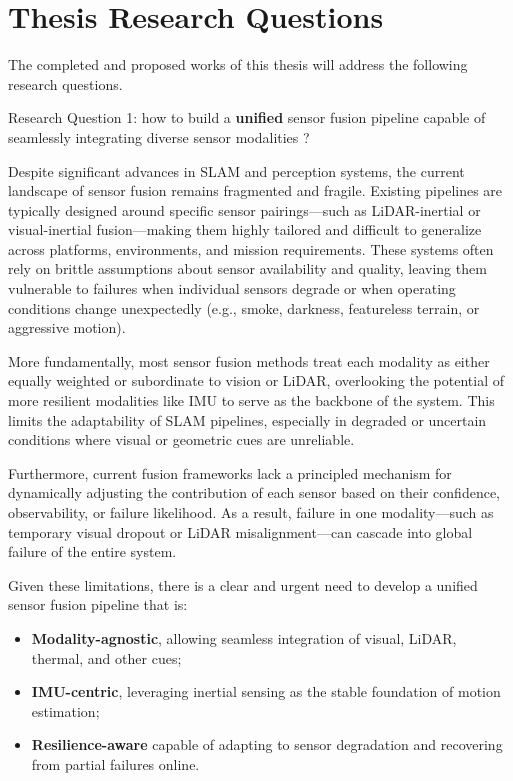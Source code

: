 \section{Thesis Research Questions}
\label{sec:thesis_research_questions}

The completed and proposed works of this thesis will address the following research questions. 

\begin{framed}
Research Question 1: how to build a \textbf{unified} sensor fusion pipeline capable of seamlessly integrating diverse sensor modalities ?
\end{framed}

Despite significant advances in SLAM and perception systems, the current landscape of sensor fusion remains fragmented and fragile. Existing pipelines are typically designed around specific sensor pairings—such as LiDAR-inertial or visual-inertial fusion—making them highly tailored and difficult to generalize across platforms, environments, and mission requirements. These systems often rely on brittle assumptions about sensor availability and quality, leaving them vulnerable to failures when individual sensors degrade or when operating conditions change unexpectedly (e.g., smoke, darkness, featureless terrain, or aggressive motion).

More fundamentally, most sensor fusion methods treat each modality as either equally weighted or subordinate to vision or LiDAR, overlooking the potential of more resilient modalities like IMU to serve as the backbone of the system. This limits the adaptability of SLAM pipelines, especially in degraded or uncertain conditions where visual or geometric cues are unreliable.

Furthermore, current fusion frameworks lack a principled mechanism for dynamically adjusting the contribution of each sensor based on their confidence, observability, or failure likelihood. As a result, failure in one modality—such as temporary visual dropout or LiDAR misalignment—can cascade into global failure of the entire system.

Given these limitations, there is a clear and urgent need to develop a unified sensor fusion pipeline that is:

\begin{itemize}
    \item \textbf{Modality-agnostic}, allowing seamless integration of visual, LiDAR, thermal, and other cues;
    \item \textbf{IMU-centric}, leveraging inertial sensing as the stable foundation of motion estimation;
    \item  \textbf{Resilience-aware}  capable of adapting to sensor degradation and recovering from partial failures online.
\end{itemize}



